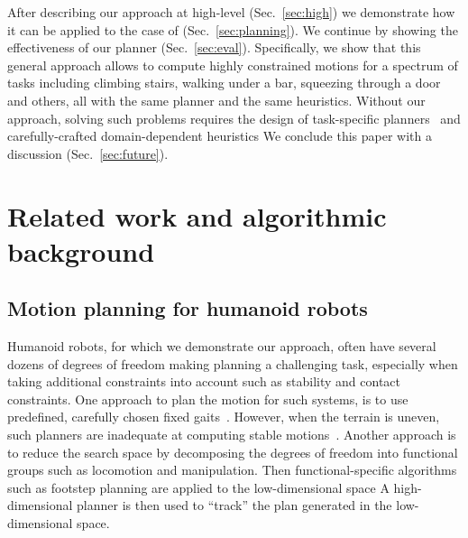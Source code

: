 \documentclass{article}
\begin{document}
%



After describing our approach at high-level (Sec.~\ref{sec:high}) we demonstrate how it can be applied to the case of \mhastar (Sec.~\ref{sec:planning}).
We continue by showing the effectiveness of our planner (Sec.~\ref{sec:eval}).
Specifically, we show that this general approach allows to compute highly constrained motions for a spectrum of tasks including climbing stairs, walking under a bar, squeezing through a door and others, all with the same planner and the same heuristics.  
Without our approach, solving such problems requires the design of task-specific planners~\cite{KKKHKHAI04} and carefully-crafted domain-dependent heuristics
We conclude this paper with a discussion (Sec.~\ref{sec:future}).


\section{Related work and algorithmic background}
\subsection{Motion planning for humanoid robots}
\label{sec:rel}
Humanoid robots, for which we demonstrate our approach, often have several dozens of degrees of freedom making planning a challenging task, especially when taking additional constraints into account such as stability and contact constraints.
One approach to plan the motion for such systems, is to use predefined, carefully chosen fixed gaits~\cite{KKKHKHAI04}. 
However, when the terrain is uneven, such planners are inadequate at computing stable motions~\cite{HBLHW08}.
Another approach is to reduce the search space by decomposing the degrees of freedom into functional groups such as locomotion and manipulation.
Then functional-specific algorithms such as footstep planning are applied to the low-dimensional space 
A high-dimensional planner is then used to ``track'' the plan generated in the low-dimensional space.
\end{document}
